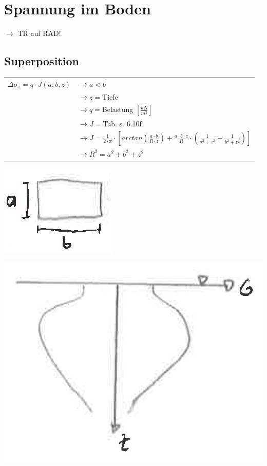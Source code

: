 \section{Spannung im Boden}
\begin{minipage}[t]{0.25\linewidth}
		$\rightarrow$ TR auf RAD!
	\subsection{Superposition}
		\begin{tabular}{ll}
		$\Delta \sigma_z=q \cdot J(a,b,z)$	& $\rightarrow a<b$ \\
											& $\rightarrow z=$Tiefe \\
											& $\rightarrow q=$Belastung $\left[\frac{kN}{m^2}\right]$ \\
											& $\rightarrow J=$Tab. s. 6.10f \\
											& $\rightarrow J=\frac{1}{2\cdot \pi} \cdot \left[arctan(\frac{a \cdot b}{R \cdot z}) + \frac{a \cdot b \cdot z}{R} \cdot  \left(\frac{1}{a^2 + z^2} + \frac{1}{b^2 + z^2}\right) \right]$ \\
											& $\rightarrow R^2=a^2 + b^2 + z^2$ \\	
		\end{tabular}

 	\vspace{\baselineskip}
 \end{minipage}
 \begin{minipage}[t]{0.3\linewidth}
	\vspace{2\baselineskip}
	\qquad \includegraphics[width=0.3\linewidth]{images/SpimBoden1.PNG}
 \end{minipage}
\begin{minipage}[t]{0.5\linewidth}
	\vspace{2\baselineskip}
		\includegraphics[width=0.4\linewidth]{images/SpimBoden2Verlauf.PNG}
\end{minipage}
 	

